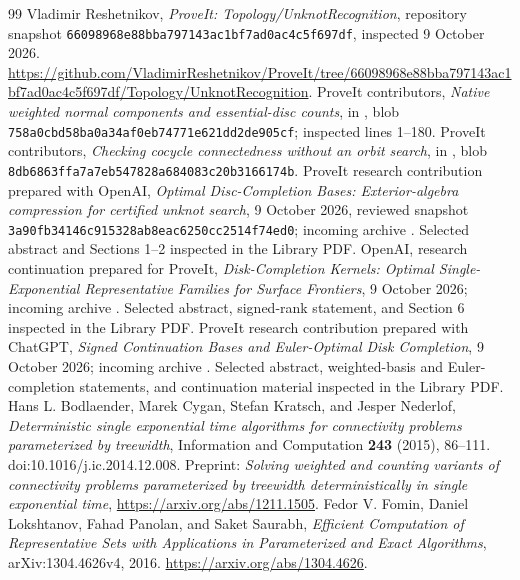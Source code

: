 \documentclass[11pt,letterpaper]{article}
\theoremstyle{definition}
\newcommand{\pin}{\texttt{66098968e88bba797143ac1bf7ad0ac4c5f697df}}
\begin{document}
\begingroup\small\raggedright
\begin{thebibliography}{99}
 Vladimir Reshetnikov, \emph{ProveIt: Topology/UnknotRecognition}, repository snapshot \pin, inspected 9 October 2026. \url{https://github.com/VladimirReshetnikov/ProveIt/tree/66098968e88bba797143ac1bf7ad0ac4c5f697df/Topology/UnknotRecognition}.
 ProveIt contributors, \emph{Native weighted normal components and essential-disc counts},  in \cite{repo}, blob \texttt{758a0cbd58ba0a34af0eb74771e621dd2de905cf}; inspected lines 1--180.
 ProveIt contributors, \emph{Checking cocycle connectedness without an orbit search},  in \cite{repo}, blob \texttt{8db6863ffa7a7eb547828a684083c20b3166174b}.
 ProveIt research contribution prepared with OpenAI, \emph{Optimal Disc-Completion Bases: Exterior-algebra compression for certified unknot search}, 9 October 2026, reviewed snapshot \texttt{3a90fb34146c915328ab8eac6250cc2514f74ed0}; incoming archive . Selected abstract and Sections 1--2 inspected in the Library PDF.
 OpenAI, research continuation prepared for ProveIt, \emph{Disk-Completion Kernels: Optimal Single-Exponential Representative Families for Surface Frontiers}, 9 October 2026; incoming archive . Selected abstract, signed-rank statement, and Section 6 inspected in the Library PDF.
 ProveIt research contribution prepared with ChatGPT, \emph{Signed Continuation Bases and Euler-Optimal Disk Completion}, 9 October 2026; incoming archive . Selected abstract, weighted-basis and Euler-completion statements, and continuation material inspected in the Library PDF.
 Hans L. Bodlaender, Marek Cygan, Stefan Kratsch, and Jesper Nederlof, \emph{Deterministic single exponential time algorithms for connectivity problems parameterized by treewidth}, Information and Computation \textbf{243} (2015), 86--111. doi:10.1016/j.ic.2014.12.008. Preprint: \emph{Solving weighted and counting variants of connectivity problems parameterized by treewidth deterministically in single exponential time}, \url{https://arxiv.org/abs/1211.1505}.
 Fedor V. Fomin, Daniel Lokshtanov, Fahad Panolan, and Saket Saurabh, \emph{Efficient Computation of Representative Sets with Applications in Parameterized and Exact Algorithms}, arXiv:1304.4626v4, 2016. \url{https://arxiv.org/abs/1304.4626}.

\end{thebibliography}
\end{document}
